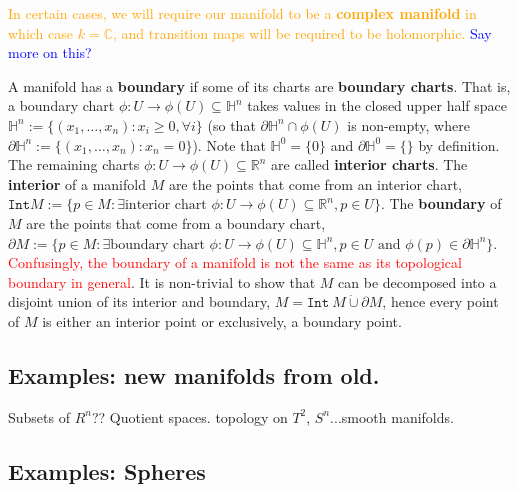 \documentclass[a4paper]{article}
\theoremstyle{definition} \newtheorem*{definition}{Definition}
\theoremstyle{definition} \newtheorem*{definitions}{Definitions}
\theoremstyle{plain} \newtheorem{theorem}{Theorem}[section]
\theoremstyle{plain} \newtheorem{proposition}[theorem]{Proposition}
\theoremstyle{plain} \newtheorem{corollary}[theorem]{Corollary}
\theoremstyle{plain} \newtheorem{lemma}[theorem]{Lemma}
\theoremstyle{plain} \newtheorem{example}[theorem]{Example}
\newcommand{\checkCorrect}[1]{\textcolor{red}{#1}}
\newcommand{\understandBetter}[1]{\textcolor{orange}{#1}}
\newcommand{\explainFurther}[1]{\textcolor{blue}{#1}}
\newcommand{\defn}[1]{\textbf{#1}}
\newcommand{\realnos}{\mathbb{R}}
\newcommand{\complexnos}{\mathbb{C}}
\begin{document}
\understandBetter{In certain cases, we will require our manifold to be a \defn{complex manifold} in which case $k=\complexnos$, and transition maps will be required to be \understandBetter{holomorphic}.}
\explainFurther{Say more on this?}

A manifold has a \defn{boundary} if some of its charts are \defn{boundary charts}. That is, a boundary chart $\phi:U\to \phi(U)\subseteq \mathbb{H}^n$ takes values in the closed upper half space $\mathbb{H}^n := \{(x_1, \ldots, x_n): x_i\geq 0, \forall i\}$ (so that $\partial \mathbb{H}^n \cap \phi(U)$ is non-empty, where $\partial \mathbb{H}^n := \{(x_1, \ldots, x_n): x_n=0\}$). Note that $\mathbb{H}^0 = \{0\}$ and $\partial \mathbb{H}^0 = \{\}$ by definition. The remaining charts $\phi:U\to \phi(U)\subseteq \realnos^n$ are called \defn{interior charts}. The \defn{interior} of a manifold $M$ are the points that come from an interior chart, $\texttt{Int} M := \{p\in M: \exists \textrm{interior chart } \phi:U\to \phi(U)\subseteq \realnos^n, p\in U \}$. The \defn{boundary} of $M$ are the points that come from a boundary chart, $\partial M:=\{p\in M: \exists \textrm{boundary chart } \phi:U\to \phi(U)\subseteq \mathbb{H}^n, p\in U \textrm{ and } \phi(p)\in \partial \mathbb{H}^n \}$. \checkCorrect{Confusingly, the boundary of a manifold is not the same as its topological boundary in general}. It is non-trivial to show that $M$ can be decomposed into a disjoint union of its interior and boundary, $M = \mathtt{Int} \ M \mathbin{\dot{\cup}} \partial M$, hence every point of $M$ is either an interior point or exclusively, a boundary point.

\subsection{Examples: new manifolds from old.}

Subsets of $R^n$?? Quotient spaces.
topology on $T^2$, $S^n$...smooth manifolds.

\subsection{Examples: Spheres}
\end{document}
